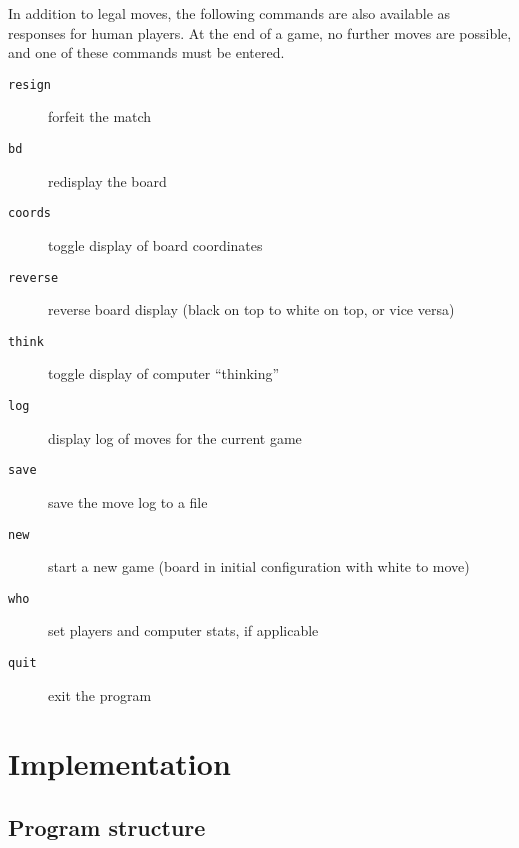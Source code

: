 \documentclass[a4paper]{article}
\begin{document}
In addition to legal moves, the following commands are also available
as responses for human players. At the end of a game, no further moves
are possible, and one of these commands must be entered.


\begin{latexonly}
\renewenvironment{description}{%
  \begin{basedescript}{%
      \desclabelwidth{0.66in}\desclabelstyle{\nextlinelabel}%
  }%
}{%
  \end{basedescript}%
}
\end{latexonly}

\begin{description}
\item[\texttt{resign}] forfeit the match
\item[\texttt{bd}] redisplay the board
\item[\texttt{coords}] toggle display of board coordinates
\item[\texttt{reverse}] reverse board display (black on top to white on top, or vice versa)
\item[\texttt{think}] toggle display of computer ``thinking''
\item[\texttt{log}] display log of moves for the current game
\item[\texttt{save}] save the move log to a file
\item[\texttt{new}] start a new game (board in initial configuration with white to move)
\item[\texttt{who}] set players and computer stats, if applicable
\item[\texttt{quit}] exit the program
\end{description}

\section{Implementation}

\subsection{Program structure}
\end{document}
